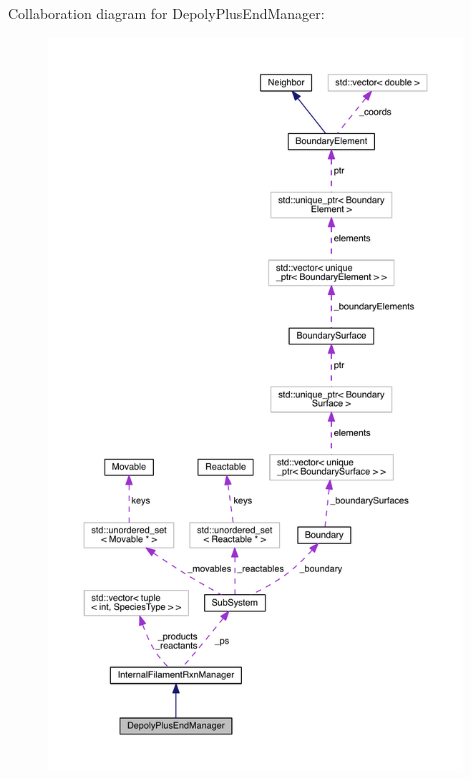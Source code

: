 Collaboration diagram for Depoly\+Plus\+End\+Manager\+:
\nopagebreak
\begin{figure}[H]
\begin{center}
\leavevmode
\includegraphics[height=550pt]{classDepolyPlusEndManager__coll__graph}
\end{center}
\end{figure}
